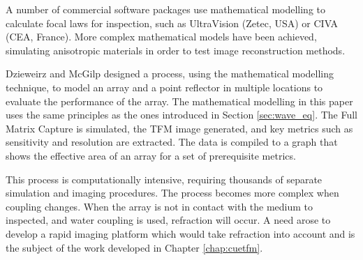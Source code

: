A number of commercial software packages use mathematical modelling to calculate focal laws for inspection, such as UltraVision\cite{ultravision_web} (Zetec, USA) or CIVA\cite{civa_web} (CEA, France). More complex mathematical models have been achieved, simulating anisotropic materials in order to test image reconstruction methods\cite{humeida_simulation_2013}.

Dzieweirz and McGilp designed a process, using the mathematical modelling technique, to model an array and a point reflector in multiple locations to evaluate the performance of the array\cite{mcgilp_inspection_2014}. The mathematical modelling in this paper uses the same principles as the ones introduced in Section \ref{sec:wave_eq}. The Full Matrix Capture is simulated, the TFM image generated, and key metrics such as sensitivity and resolution are extracted. The data is compiled to a graph that shows the effective area of an array for a set of prerequisite metrics.

This process is computationally intensive, requiring thousands of separate simulation and imaging procedures. The process becomes more complex when coupling changes. When the array is not in contact with the medium to inspected, and water coupling is used, refraction will occur. A need arose to develop a rapid imaging platform which would take refraction into account and is the subject of the work developed in Chapter \ref{chap:cuetfm}.



